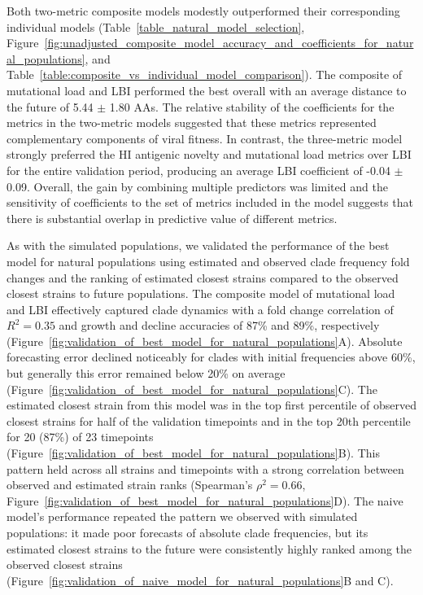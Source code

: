 Both two-metric composite models modestly outperformed their corresponding individual models (Table~\ref{table_natural_model_selection}, Figure~\ref{fig:unadjusted_composite_model_accuracy_and_coefficients_for_natural_populations}, and Table~\ref{table:composite_vs_individual_model_comparison}).
The composite of mutational load and LBI performed the best overall with an average distance to the future of 5.44 $\pm$ 1.80 AAs.
The relative stability of the coefficients for the metrics in the two-metric models suggested that these metrics represented complementary components of viral fitness.
In contrast, the three-metric model strongly preferred the HI antigenic novelty and mutational load metrics over LBI for the entire validation period, producing an average LBI coefficient of -0.04 $\pm$ 0.09.
Overall, the gain by combining multiple predictors was limited and the sensitivity of coefficients to the set of metrics included in the model suggests that there is substantial overlap in predictive value of different metrics.

As with the simulated populations, we validated the performance of the best model for natural populations using estimated and observed clade frequency fold changes and the ranking of estimated closest strains compared to the observed closest strains to future populations.
The composite model of mutational load and LBI effectively captured clade dynamics with a fold change correlation of $R^2 = 0.35$ and growth and decline accuracies of 87\% and 89\%, respectively (Figure~\ref{fig:validation_of_best_model_for_natural_populations}A).
Absolute forecasting error declined noticeably for clades with initial frequencies above 60\%, but generally this error remained below 20\% on average (Figure~\ref{fig:validation_of_best_model_for_natural_populations}C).
The estimated closest strain from this model was in the top first percentile of observed closest strains for half of the validation timepoints and in the top 20th percentile for 20 (87\%) of 23 timepoints (Figure~\ref{fig:validation_of_best_model_for_natural_populations}B).
This pattern held across all strains and timepoints with a strong correlation between observed and estimated strain ranks (Spearman's $\rho^2 = 0.66$, Figure~\ref{fig:validation_of_best_model_for_natural_populations}D).
The naive model's performance repeated the pattern we observed with simulated populations: it made poor forecasts of absolute clade frequencies, but its estimated closest strains to the future were consistently highly ranked among the observed closest strains (Figure~\ref{fig:validation_of_naive_model_for_natural_populations}B and C).

